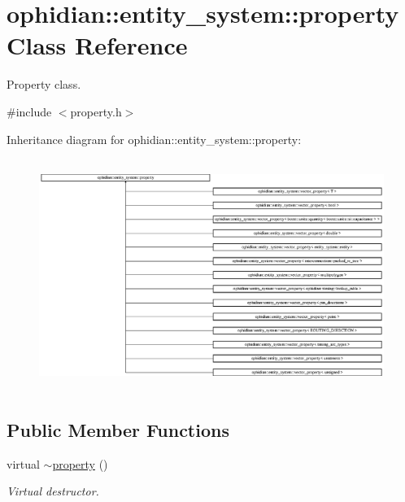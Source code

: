 \hypertarget{classophidian_1_1entity__system_1_1property}{\section{ophidian\-:\-:entity\-\_\-system\-:\-:property Class Reference}
\label{classophidian_1_1entity__system_1_1property}
}


Property class.  




{\ttfamily \#include $<$property.\-h$>$}

Inheritance diagram for ophidian\-:\-:entity\-\_\-system\-:\-:property\-:\begin{figure}[H]
\begin{center}
\leavevmode
\includegraphics[height=7.540395cm]{classophidian_1_1entity__system_1_1property}
\end{center}
\end{figure}
\subsection*{Public Member Functions}
\begin{DoxyCompactItemize}
\item 
\hypertarget{classophidian_1_1entity__system_1_1property_a78791a831e24a3f6bde835a00eb7ba7f}{virtual \hyperlink{classophidian_1_1entity__system_1_1property_a78791a831e24a3f6bde835a00eb7ba7f}{$\sim$property} ()}\label{classophidian_1_1entity__system_1_1property_a78791a831e24a3f6bde835a00eb7ba7f}

\begin{DoxyCompactList}\small\item\em Virtual destructor. \end{DoxyCompactList}\end{DoxyCompactItemize}
